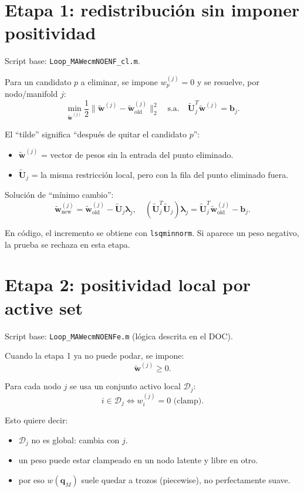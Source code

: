 \documentclass[11pt,a4paper]{article}
\newcommand{\U}{\bm U}
\begin{document}
\section{Etapa 1: redistribuci\'on sin imponer positividad}
Script base: \texttt{Loop\_MAWecmNOENF\_cl.m}.

Para un candidato $p$ a eliminar, se impone $w_{p}^{(j)}=0$ y se resuelve, por
nodo/manifold $j$:
\[
\min_{\widetilde{\bm w}^{(j)}}
\frac{1}{2}\|\widetilde{\bm w}^{(j)}-\widetilde{\bm w}_{\text{old}}^{(j)}\|_2^2
\quad
\text{s.a.}\quad
\widetilde{\U}_j^T\widetilde{\bm w}^{(j)}=\bm b_j.
\]

El ``tilde'' significa ``despu\'es de quitar el candidato $p$'':
\begin{itemize}[leftmargin=0.8cm]
    \item $\widetilde{\bm w}^{(j)}$ = vector de pesos sin la entrada del punto eliminado.
    \item $\widetilde{\U}_j$ = la misma restricci\'on local, pero con la fila del punto eliminado fuera.
\end{itemize}

Soluci\'on de ``m\'inimo cambio'':
\[
\widetilde{\bm w}^{(j)}_{\text{new}}
=
\widetilde{\bm w}^{(j)}_{\text{old}}
-\widetilde{\U}_j\bm\lambda_j,
\quad
(\widetilde{\U}_j^T\widetilde{\U}_j)\bm\lambda_j
=
\widetilde{\U}_j^T\widetilde{\bm w}^{(j)}_{\text{old}}-\bm b_j.
\]

En c\'odigo, el incremento se obtiene con \texttt{lsqminnorm}.
Si aparece un peso negativo, la prueba se rechaza en esta etapa.

\section{Etapa 2: positividad local por active set}
Script base: \texttt{Loop\_MAWecmNOENFe.m} (l\'ogica descrita en el DOC).

Cuando la etapa 1 ya no puede podar, se impone:
\[
\widetilde{\bm w}^{(j)}\ge 0.
\]

Para cada nodo $j$ se usa un conjunto activo local $\mathcal D_j$:
\[
i\in\mathcal D_j \iff w_i^{(j)}=0 \text{ (clamp)}.
\]

Esto quiere decir:
\begin{itemize}[leftmargin=0.8cm]
    \item $\mathcal D_j$ no es global: cambia con $j$.
    \item un peso puede estar clampeado en un nodo latente y libre en otro.
    \item por eso $w(\bm q_M)$ suele quedar a trozos (piecewise), no perfectamente suave.
\end{itemize}
\end{document}
